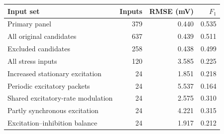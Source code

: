 \begin{tabularx}{\textwidth}{Xrrr}
\toprule
Input set & Inputs & RMSE (mV) & $F_1$\\
\midrule
Primary panel & 379 & 0.440 & 0.535 \\
All original candidates & 637 & 0.439 & 0.511 \\
Excluded candidates & 258 & 0.438 & 0.499 \\
All stress inputs & 120 & 3.585 & 0.225 \\
\midrule
Increased stationary excitation & 24 & 1.851 & 0.218 \\
Periodic excitatory packets & 24 & 5.537 & 0.164 \\
Shared excitatory-rate modulation & 24 & 2.575 & 0.310 \\
Partly synchronous excitation & 24 & 4.221 & 0.315 \\
Excitation--inhibition balance & 24 & 1.917 & 0.212 \\
\bottomrule
\end{tabularx}
